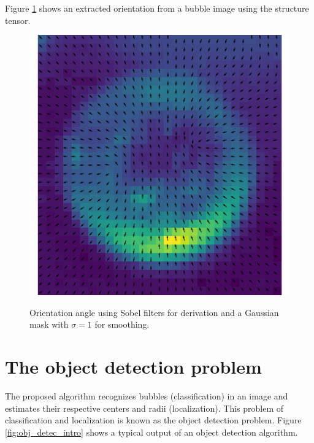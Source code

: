 		Figure \ref{fig:struct_tensor_demo} shows an extracted orientation from a bubble image using the structure tensor.
		
		\begin{figure}
			\centering
			\caption{Orientation angle using Sobel filters for derivation and a Gaussian mask with $\sigma =1$ for smoothing.}		
			\includegraphics[scale=0.5]{images/structure_tensor_demo.png}
			\label{fig:struct_tensor_demo}
		\end{figure}
		
	
	\section{The object detection problem}\label{the_object_detection_problem}
	
	The proposed algorithm recognizes bubbles (classification) in an image and estimates their respective centers and radii (localization). This problem of classification and localization is known as the object detection problem. Figure \ref{fig:obj_detec_intro} shows a typical output of an object detection algorithm. 
	
